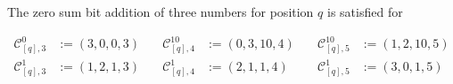 \begin{definition}
    
    The zero sum bit addition of three numbers for position $q$ is satisfied for

    \begin{equation}
        \begin{aligned}
                \mathcal{C}^{0}_{[q],3} &:= \left(3, 0, 0, 3\right) \quad & \mathcal{C}^{10}_{[q],4} &:= \left(0, 3, 10, 4\right) \quad & \mathcal{C}^{10}_{[q],5} &:= \left(1, 2, 10, 5\right)\\
                \mathcal{C}^{1}_{[q],3} &:= \left(1, 2, 1, 3\right) \quad & \mathcal{C}^{1}_{[q],4} &:= \left(2, 1, 1, 4\right) \quad & \mathcal{C}^{1}_{[q],5} &:= \left(3, 0, 1, 5\right)
            \label{eq:zerosumbitadditionproperties}
        \end{aligned}
    \end{equation}

\label{def:zerosumbitadditionproperties}
\end{definition}


